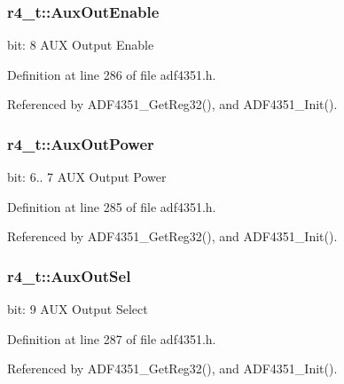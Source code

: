 \subsubsection[{\texorpdfstring{Aux\+Out\+Enable}{AuxOutEnable}}]{ r4\+\_\+t\+::\+Aux\+Out\+Enable}\hypertarget{structr4__t_ab6c43ed3da1189c3de8cf2cafafb03f3}{}\label{structr4__t_ab6c43ed3da1189c3de8cf2cafafb03f3}
bit\+: 8 A\+UX Output Enable 

Definition at line 286 of file adf4351.\+h.



Referenced by A\+D\+F4351\+\_\+\+Get\+Reg32(), and A\+D\+F4351\+\_\+\+Init().

\subsubsection[{\texorpdfstring{Aux\+Out\+Power}{AuxOutPower}}]{ r4\+\_\+t\+::\+Aux\+Out\+Power}\hypertarget{structr4__t_a92b00824868c7911a73217cbdd48ca96}{}\label{structr4__t_a92b00824868c7911a73217cbdd48ca96}
bit\+: 6.. 7 A\+UX Output Power 

Definition at line 285 of file adf4351.\+h.



Referenced by A\+D\+F4351\+\_\+\+Get\+Reg32(), and A\+D\+F4351\+\_\+\+Init().

\subsubsection[{\texorpdfstring{Aux\+Out\+Sel}{AuxOutSel}}]{ r4\+\_\+t\+::\+Aux\+Out\+Sel}\hypertarget{structr4__t_af75cec4d15f4f2e086db3be6d4c3c215}{}\label{structr4__t_af75cec4d15f4f2e086db3be6d4c3c215}
bit\+: 9 A\+UX Output Select 

Definition at line 287 of file adf4351.\+h.



Referenced by A\+D\+F4351\+\_\+\+Get\+Reg32(), and A\+D\+F4351\+\_\+\+Init().

